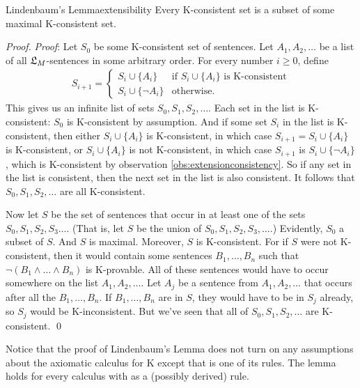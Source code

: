 \begin{theorem}{Lindenbaum's Lemma}{extensibility}
  Every K-consistent set is a subset of some maximal K-consistent set.
\end{theorem}
%
\begin{proof}
  \emph{Proof}: Let $S_0$ be some K-consistent set of sentences. Let
  $A_1,A_2,\ldots$ be a list of all $\mathfrak{L}_M$-sentences in some arbitrary
  order. For every number $i\geq 0$, define
  \begin{gather*}
    S_{i+1} = \begin{cases} S_i \cup \{ A_i \} & \text{if $S_i \cup \{ A_i \}$ is K-consistent}\\
      S_i \cup \{ \neg A_i \} & \text{otherwise}.
    \end{cases}
  \end{gather*}
%
  This gives us an infinite list of sets $S_0,S_1,S_2,\ldots$. Each set in the
  list is K-consistent: $S_0$ is K-consistent by assumption. And if some set
  $S_i$ in the list is K-consistent, then either $S_i \cup \{ A_i \}$ is
  K-consistent, in which case $S_{i+1} = S_i \cup \{ A_i \}$ is K-consistent, or
  $S_i \cup \{ A_i \}$ is not K-consistent, in which case $S_{i+1}$ is
  $S_i \cup \{ \neg A_i \}$, which is K-consistent by observation
  \ref{obs:extensionconsistency}. So if any set in the list is consistent, then
  the next set in the list is also consistent. It follows that
  $S_0,S_1,S_2,\ldots$ are all K-consistent.

  Now let $S$ be the set of sentences that occur in at least one of the sets
  $S_{0},S_1, S_2,S_3\ldots$. (That is, let $S$ be the union of
  $S_{0},S_1,S_2,S_3,\ldots$.) Evidently, $S_0$ a subset of $S$. And $S$ is
  maximal. Moreover, $S$ is K-consistent. For if $S$ were not K-consistent, then
  it would contain some sentences $B_1,\ldots,B_n$ such that
  $\neg (B_1\land \ldots\land B_n)$ is K-provable. All of these sentences would
  have to occur somewhere on the list $A_1,A_2,\ldots$. Let $A_j$ be a sentence
  from $A_1,A_2,\ldots$ that occurs after all the $B_1,\ldots,B_n$. If
  $B_1,\ldots,B_n$ are in $S$, they would have to be in $S_j$ already, so $S_j$
  would be K-inconsistent. But we've seen that all of $S_0,S_1,S_2,\ldots$ are
  K-consistent. \qed
\end{proof}

Notice that the proof of Lindenbaum's Lemma does not turn on any assumptions
about the axiomatic calculus for K except that  is one of its rules. The
lemma holds for every calculus with  as a (possibly derived) rule.

